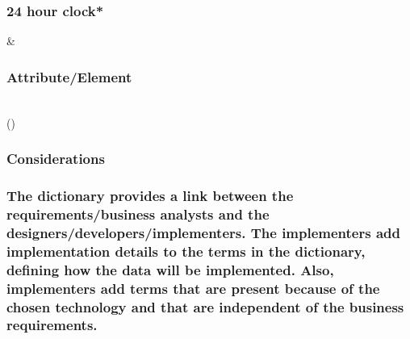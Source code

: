 \documentclass[
]{article}
\begin{document}
\begin{longtable}[]
\begin{minipage}[t]{\linewidth}
\hypertarget{hour-clock-3}{%
\subsubsection{\texorpdfstring{24 hour clock*
}{24 hour clock* }}\label{hour-clock-3}}
\end{minipage} & \begin{minipage}[t]{\linewidth}\raggedright
\hypertarget{attributeelement-15}{%
\subsubsection{Attribute/Element}\label{attributeelement-15}}
\end{minipage} \\
\bottomrule()
\end{longtable}

\hypertarget{section-17}{%
\subsubsection{}\label{section-17}}

\hypertarget{considerations-16}{%
\subsubsection{\texorpdfstring{Considerations
}{Considerations }}\label{considerations-16}}

\hypertarget{the-dictionary-provides-a-link-between-the-requirementsbusiness-analysts-and-the-designersdevelopersimplementers.-the-implementers-add-implementation-details-to-the-terms-in-the-dictionary-defining-how-the-data-will-be-implemented.-also-implementers-add-terms-that-are-present-because-of-the-chosen-technology-and-that-are-independent-of-the-business-requirements.}{%
\subsubsection{The dictionary provides a link between the
requirements/business analysts and the
designers/developers/implementers. The implementers add implementation
details to the terms in the dictionary, defining how the data will be
implemented. Also, implementers add terms that are present because of
the chosen technology and that are independent of the business
requirements.}\label{the-dictionary-provides-a-link-between-the-requirementsbusiness-analysts-and-the-designersdevelopersimplementers.-the-implementers-add-implementation-details-to-the-terms-in-the-dictionary-defining-how-the-data-will-be-implemented.-also-implementers-add-terms-that-are-present-because-of-the-chosen-technology-and-that-are-independent-of-the-business-requirements.}}
\end{document}
